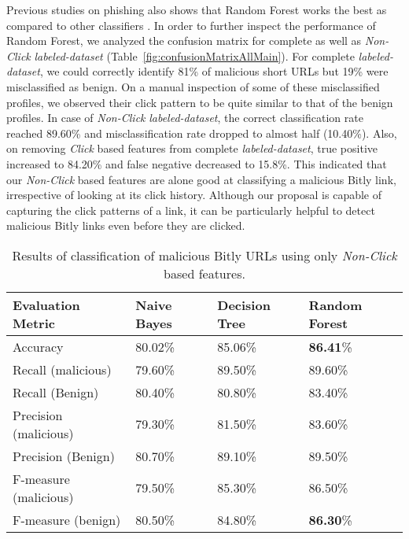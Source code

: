 \documentclass[conference]{IEEEtran}
\begin{document}
Previous studies on phishing also shows that Random Forest works the best as compared to other classifiers \cite{9,17}. In order to further inspect the performance of Random Forest, we analyzed the confusion matrix for complete as well as \textit{Non-Click} \textit{labeled-dataset} (Table~\ref{fig:confusionMatrixAllMain}). For complete \textit{labeled-dataset}, we could correctly identify 81\% of malicious short URLs but 19\% were misclassified as benign. On a manual inspection of some of these misclassified profiles, we observed their click pattern to be quite similar to that of the benign profiles. In case of \textit{Non-Click} \textit{labeled-dataset}, the correct classification rate reached 89.60\% and misclassification rate dropped to almost half (10.40\%). Also, on removing \textit{Click} based features from complete \textit{labeled-dataset}, true positive increased to 84.20\% and false negative decreased to 15.8\%. This indicated that our \textit{Non-Click} based features are alone good at classifying a malicious Bitly link, irrespective of looking at its click history. Although our proposal is capable of capturing the click patterns of a link, it can be particularly helpful to detect malicious Bitly links even before they are clicked.
\begin{table}[h]
\small
\begin{center}
\begin{tabular}{|p{2.9cm}|p{1cm}|p{1cm}|p{1cm}|}
    \hline
    {\bf Evaluation Metric}     & {\bf Naive Bayes} & {\bf Decision Tree} & {\bf Random Forest} \\ \hline
    Accuracy              & 80.02\%     & 85.06\%       & {\bf 86.41}\%       \\ \hline
    Recall (malicious)    & 79.60\%     & 89.50\%       & 89.60\%       \\ \hline
    Recall (Benign)       & 80.40\%     & 80.80\%       & 83.40\%       \\ \hline
    Precision (malicious) & 79.30\%     & 81.50\%       & 83.60\%       \\ \hline
    Precision (Benign)    & 80.70\%     & 89.10\%       & 89.50\%       \\ \hline
    F-measure (malicious) & 79.50\%     & 85.30\%       & 86.50\%       \\ \hline
    F-measure (benign)    & 80.50\%     & 84.80\%       & {\bf 86.30}\%       \\ \hline
    \end{tabular}
    \caption {\label{classifierNonClickFeatures} Results of classification of malicious Bitly URLs using only \textit{Non-Click} based features.}
\end{center}
\end{table}
\end{document}
